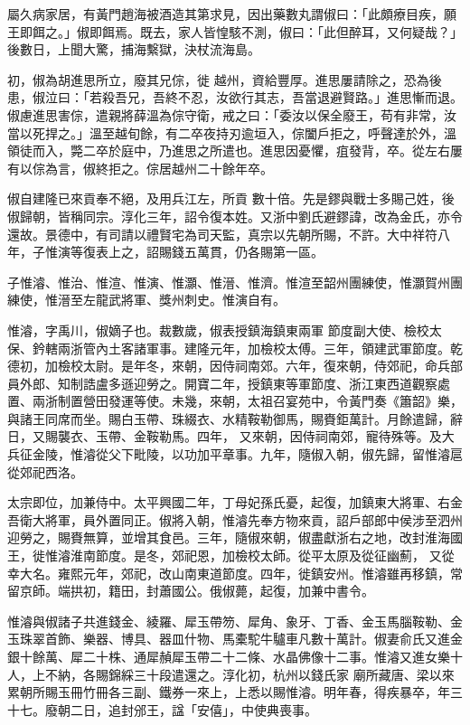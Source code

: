 \begin{pinyinscope}
 屬久病家居，有黃門趙海被酒造其第求見，因出藥數丸謂俶曰：「此頗療目疾，願王即餌之。」俶即餌焉。既去，家人皆惶駭不測，俶曰：「此但醉耳，又何疑哉？」後數日，上聞大驚，捕海繫獄，決杖流海島。



 初，俶為胡進思所立，廢其兄倧，徙
 越州，資給豐厚。進思屢請除之，恐為後患，俶泣曰：「若殺吾兄，吾終不忍，汝欲行其志，吾當退避賢路。」進思慚而退。俶慮進思害倧，遣親將薛溫為倧守衛，戒之曰：「委汝以保全廢王，苟有非常，汝當以死捍之。」溫至越旬餘，有二卒夜持刃逾垣入，倧闔戶拒之，呼聲達於外，溫領徒而入，斃二卒於庭中，乃進思之所遣也。進思因憂懼，疽發背，卒。從左右屢有以倧為言，俶終拒之。倧居越州二十餘年卒。



 俶自建隆已來貢奉不絕，及用兵江左，所貢
 數十倍。先是鏐與戰士多賜己姓，後俶歸朝，皆稱同宗。淳化三年，詔令復本姓。又浙中劉氏避鏐諱，改為金氏，亦令還故。景德中，有司請以禮賢宅為司天監，真宗以先朝所賜，不許。大中祥符八年，子惟演等復表上之，詔賜錢五萬貫，仍各賜第一區。



 子惟濬、惟治、惟渲、惟演、惟灝、惟溍、惟濟。惟渲至韶州團練使，惟灝賀州團練使，惟溍至左龍武將軍、獎州刺史。惟演自有。



 惟濬，字禹川，俶嫡子也。裁數歲，俶表授鎮海鎮東兩軍
 節度副大使、檢校太保、鈐轄兩浙管內土客諸軍事。建隆元年，加檢校太傅。三年，領建武軍節度。乾德初，加檢校太尉。是年冬，來朝，因侍祠南郊。六年，復來朝，侍郊祀，命兵部員外郎、知制誥盧多遜迎勞之。開寶二年，授鎮東等軍節度、浙江東西道觀察處置、兩浙制置營田發運等使。未幾，來朝，太祖召宴苑中，令黃門奏《簫韶》樂，與諸王同席而坐。賜白玉帶、珠綴衣、水精鞍勒御馬，賜賚鉅萬計。月餘遣歸，辭日，又賜襲衣、玉帶、金鞍勒馬。四年，
 又來朝，因侍祠南郊，寵待殊等。及大兵征金陵，惟濬從父下毗陵，以功加平章事。九年，隨俶入朝，俶先歸，留惟濬扈從郊祀西洛。



 太宗即位，加兼侍中。太平興國二年，丁母妃孫氏憂，起復，加鎮東大將軍、右金吾衛大將軍，員外置同正。俶將入朝，惟濬先奉方物來貢，詔戶部郎中侯涉至泗州迎勞之，賜賚無算，並增其食邑。三年，隨俶來朝，俶盡獻浙右之地，改封淮海國王，徙惟濬淮南節度。是冬，郊祀恩，加檢校太師。從平太原及從征幽薊，
 又從幸大名。雍熙元年，郊祀，改山南東道節度。四年，徙鎮安州。惟濬雖再移鎮，常留京師。端拱初，籍田，封蕭國公。俄俶薨，起復，加兼中書令。



 惟濬與俶諸子共進錢金、綾羅、犀玉帶笏、犀角、象牙、丁香、金玉馬腦鞍勒、金玉珠翠首飾、樂器、博具、器皿什物、馬橐駝牛驢車凡數十萬計。俶妻俞氏又進金銀十餘萬、犀二十株、通犀赬犀玉帶二十二條、水晶佛像十二事。惟濬又進女樂十人，上不納，各賜錦綵三十段遣還之。淳化初，杭州以錢氏家
 廟所藏唐、梁以來累朝所賜玉冊竹冊各三副、鐵券一來上，上悉以賜惟濬。明年春，得疾暴卒，年三十七。廢朝二日，追封邠王，諡「安僖」，中使典喪事。




\end{pinyinscope}
